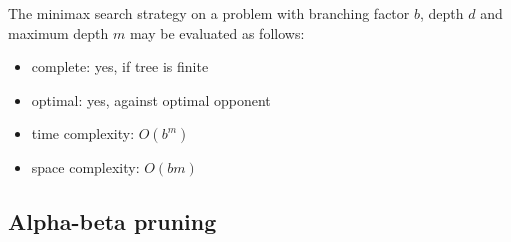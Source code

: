 \documentclass{article}
\begin{document}
\begin{theorem}
    The minimax search strategy on a problem with branching
    factor $b$, depth $d$ and maximum depth $m$ may be evaluated
    as follows:
    \begin{itemize}
        \item complete: yes, if tree is finite
        \item optimal: yes, against optimal opponent
        \item time complexity: $O(b^m)$
        \item space complexity: $O(bm)$
    \end{itemize}
\end{theorem}

\subsection{Alpha-beta pruning}
\end{document}
